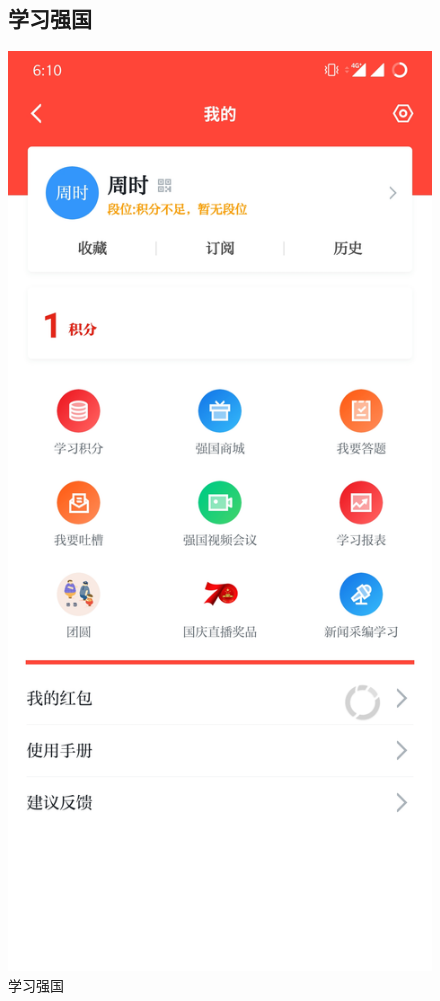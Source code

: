 \documentclass{article}
\begin{document}
\begin{itemize}
\begin{figure}[htb!]
\item\subsection{学习强国}
\centering
\includegraphics[scale=0.25]{xuexiqiangguo}
\caption{学习强国}
\label{fig:xuexiqiangguo}
\end{figure}


\end{itemize}
\end{document}
